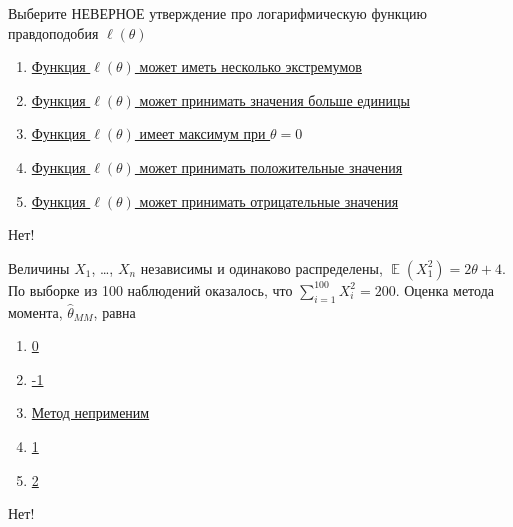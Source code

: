\documentclass[t]{beamer}
\DeclareMathOperator{\E}{\mathbb{E}}
\begin{document}
 \begin{frame} \label{35-No} 
\begin{block}{35} 

 Выберите НЕВЕРНОЕ утверждение про логарифмическую функцию правдоподобия $\ell(\theta)$


 \end{block} 
\begin{enumerate} 
\item[] \hyperlink{35-No}{\beamergotobutton{} Функция $\ell(\theta)$ может иметь несколько экстремумов}
\item[] \hyperlink{35-No}{\beamergotobutton{} Функция $\ell(\theta)$ может принимать значения больше единицы}
\item[] \hyperlink{35-Yes}{\beamergotobutton{} Функция $\ell(\theta)$ имеет максимум при $\theta=0$}
\item[] \hyperlink{35-No}{\beamergotobutton{} Функция $\ell(\theta)$ может принимать положительные значения}
\item[] \hyperlink{35-No}{\beamergotobutton{} Функция $\ell(\theta)$ может принимать отрицательные значения}
\end{enumerate} 

 \alert{Нет!} 
\end{frame} 


 \begin{frame} \label{36-No} 
\begin{block}{36} 

Величины $X_1$, \ldots, $X_n$ независимы и одинаково распределены, $\E(X_1^2)=2\theta + 4$. По выборке из 100 наблюдений оказалось, что $\sum_{i=1}^{100} X_i^2 = 200$. Оценка метода момента, $\hat\theta_{MM}$, равна


 \end{block} 
\begin{enumerate} 
\item[] \hyperlink{36-No}{\beamergotobutton{} 0}
\item[] \hyperlink{36-Yes}{\beamergotobutton{} -1}
\item[] \hyperlink{36-No}{\beamergotobutton{} Метод неприменим}
\item[] \hyperlink{36-No}{\beamergotobutton{} 1}
\item[] \hyperlink{36-No}{\beamergotobutton{} 2}
\end{enumerate} 

 \alert{Нет!} 
\end{frame} 
\end{document}
